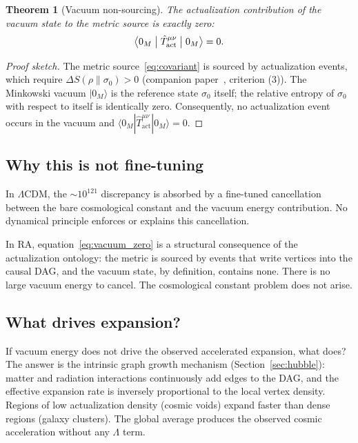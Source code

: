 \documentclass[11pt,twocolumn]{article}
\theoremstyle{plain}
\newtheorem{theorem}{Theorem}[section]
\theoremstyle{remark}
\newcommand{\Tact}{\hat{T}^{\mu\nu}_{\mathrm{act}}}
\begin{document}
\begin{theorem}[Vacuum non-sourcing]
\label{thm:vacuum}
The actualization contribution of the vacuum state to the
metric source is exactly zero:
\begin{equation}
  \bigl\langle 0_M \bigm| \hat{T}^{\mu\nu}_{\mathrm{act}} \bigm| 0_M \bigr\rangle
  = 0.
  \label{eq:vacuum_zero}
\end{equation}
\end{theorem}

\begin{proof}[Proof sketch]
The metric source~\eqref{eq:covariant} is sourced by actualization events,
which require $\Delta S(\rho\|\sigma_0) > 0$
(companion paper~\cite{Sandeman2026P2}, criterion (3)).
The Minkowski vacuum $|0_M\rangle$ is the reference state $\sigma_0$
itself; the relative entropy of $\sigma_0$ with respect to itself is
identically zero.
Consequently, no actualization event occurs in the vacuum and
$\langle 0_M | \Tact | 0_M \rangle = 0$.
\end{proof}

\subsection{Why this is not fine-tuning}

In $\Lambda$CDM, the $\sim\!10^{121}$ discrepancy is absorbed by a
fine-tuned cancellation between the bare cosmological constant and
the vacuum energy contribution.
No dynamical principle enforces or explains this cancellation.

In RA, equation~\eqref{eq:vacuum_zero} is a structural consequence
of the actualization ontology: the metric is sourced by events
that write vertices into the causal DAG, and the vacuum state,
by definition, contains none.
There is no large vacuum energy to cancel.
The cosmological constant problem does not arise.

\subsection{What drives expansion?}

If vacuum energy does not drive the observed accelerated expansion,
what does?
The answer is the intrinsic graph growth mechanism
(Section~\ref{sec:hubble}):
matter and radiation interactions continuously add edges to the DAG,
and the effective expansion rate is inversely proportional to the
local vertex density.
Regions of low actualization density (cosmic voids) expand faster
than dense regions (galaxy clusters).
The global average produces the observed cosmic acceleration without
any $\Lambda$ term.
\end{document}

